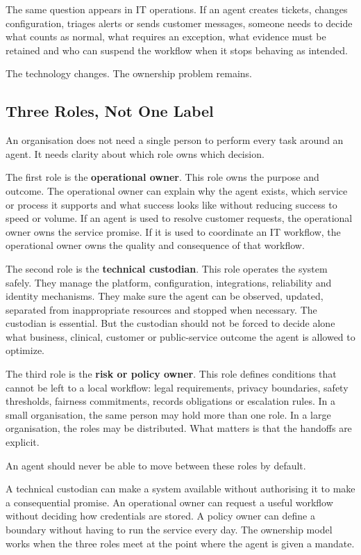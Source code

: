 The same question appears in IT operations. If an agent creates tickets,
changes configuration, triages alerts or sends customer messages,
someone needs to decide what counts as normal, what requires an
exception, what evidence must be retained and who can suspend the
workflow when it stops behaving as intended.

The technology changes. The ownership problem remains.

\subsection{Three Roles, Not One Label}\label{three-roles-not-one-label}

An organisation does not need a single person to perform every task
around an agent. It needs clarity about which role owns which decision.

The first role is the \textbf{operational owner}. This role owns the
purpose and outcome. The operational owner can explain why the agent
exists, which service or process it supports and what success looks like
without reducing success to speed or volume. If an agent is used to
resolve customer requests, the operational owner owns the service
promise. If it is used to coordinate an IT workflow, the operational
owner owns the quality and consequence of that workflow.

The second role is the \textbf{technical custodian}. This role operates
the system safely. They manage the platform, configuration,
integrations, reliability and identity mechanisms. They make sure the
agent can be observed, updated, separated from inappropriate resources
and stopped when necessary. The custodian is essential. But the
custodian should not be forced to decide alone what business, clinical,
customer or public-service outcome the agent is allowed to optimize.

The third role is the \textbf{risk or policy owner}. This role defines
conditions that cannot be left to a local workflow: legal requirements,
privacy boundaries, safety thresholds, fairness commitments, records
obligations or escalation rules. In a small organisation, the same
person may hold more than one role. In a large organisation, the roles
may be distributed. What matters is that the handoffs are explicit.

An agent should never be able to move between these roles by default.

A technical custodian can make a system available without authorising it
to make a consequential promise. An operational owner can request a
useful workflow without deciding how credentials are stored. A policy
owner can define a boundary without having to run the service every day.
The ownership model works when the three roles meet at the point where
the agent is given a mandate.

